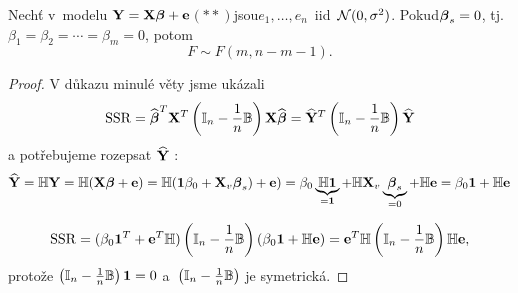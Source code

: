 \begin{theorem}
Nechť v~modelu $\Y = \X \betab + \eb$$ (**) $jsou$ e_1,\dots, e_n $~iid~$ \Nn $. Pokud$ \betab_s = 0 $, tj.$ \beta_1 = \beta_2 = \cdots = \beta_m = 0 $, potom
 $$
F \sim F(m, n - m -1).
 $$
\end{theorem}

\begin{proof}
V důkazu minulé věty jsme ukázali
 $$
\SSR = \wbetab^T \X^T \left(\Identita{n} - \lomn{1} \Bm \right) \X \wbetab = \hYb^T \left(\Identita{n} - \lomn{1} \Bm \right) \hYb
 $$
a potřebujeme rozepsat $\hYb$ :
 $$
\hYb = \Hm \Y = \Hm (\X \betab + \eb) = \Hm (\jednab \beta_0 + \X_v \betab_s)+ \eb) = \beta_0 \underbrace{\Hm \jednab}_{ = \jednab} + \Hm \X_v \underbrace{\betab_s}_{ = 0} + \Hm \eb = \beta_0 \jednab + \Hm \eb
 $$

 $$
\SSR = (\beta_0 \jednab^T + \eb^T \Hm)\left(\Identita{n} - \lomn{1} \Bm \right) (\beta_0 \jednab + \Hm \eb) = \eb^T \Hm \left(\Identita{n} - \lomn{1} \Bm \right) \Hm \eb,
 $$
protože $\left(\Identita{n} - \lomn{1} \Bm \right) \jednab = 0$ a~$\left(\Identita{n} - \lomn{1} \Bm \right)$ je symetrická.


\end{proof}

